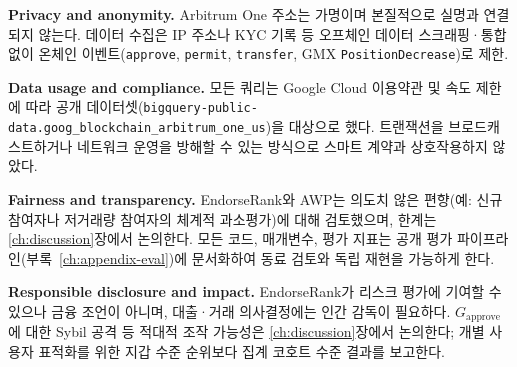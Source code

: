 \textbf{Privacy and anonymity.} Arbitrum One 주소는 가명이며 본질적으로 실명과 연결되지 않는다. 데이터 수집은 IP 주소나 KYC 기록 등 오프체인 데이터 스크래핑·통합 없이 온체인 이벤트(\texttt{approve}, \texttt{permit}, \texttt{transfer}, GMX \texttt{PositionDecrease})로 제한.

\textbf{Data usage and compliance.} 모든 쿼리는 Google Cloud 이용약관 및 속도 제한에 따라 공개 데이터셋(\texttt{bigquery-public-data.goog\_blockchain\_arbitrum\_one\_us})을 대상으로 했다. 트랜잭션을 브로드캐스트하거나 네트워크 운영을 방해할 수 있는 방식으로 스마트 계약과 상호작용하지 않았다.

\textbf{Fairness and transparency.} EndorseRank와 AWP는 의도치 않은 편향(예: 신규 참여자나 저거래량 참여자의 체계적 과소평가)에 대해 검토했으며, 한계는 \ref{ch:discussion}장에서 논의한다. 모든 코드, 매개변수, 평가 지표는 공개 평가 파이프라인(부록~\ref{ch:appendix-eval})에 문서화하여 동료 검토와 독립 재현을 가능하게 한다.

\textbf{Responsible disclosure and impact.} EndorseRank가 리스크 평가에 기여할 수 있으나 금융 조언이 아니며, 대출·거래 의사결정에는 인간 감독이 필요하다. $G_{\text{approve}}$에 대한 Sybil 공격 등 적대적 조작 가능성은 \ref{ch:discussion}장에서 논의한다; 개별 사용자 표적화를 위한 지갑 수준 순위보다 집계 코호트 수준 결과를 보고한다.
